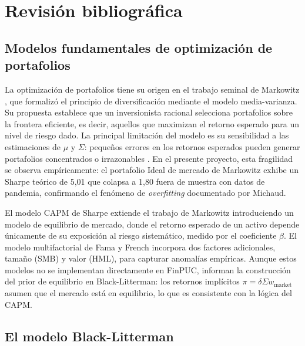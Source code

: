 \section{Revisi\'on bibliogr\'afica}

\subsection{Modelos fundamentales de optimizaci\'on de portafolios}

La optimizaci\'on de portafolios tiene su origen en el trabajo seminal de
Markowitz \cite{markowitz1952}, que formaliz\'o el principio de
diversificaci\'on mediante el modelo media-varianza. Su propuesta establece
que un inversionista racional selecciona portafolios sobre la frontera
eficiente, es decir, aquellos que maximizan el retorno esperado para un nivel
de riesgo dado. La principal limitaci\'on del modelo es su sensibilidad a las
estimaciones de $\mu$ y $\Sigma$: peque\~nos errores en los retornos
esperados pueden generar portafolios concentrados o irrazonables
\cite{michaud1989}. En el presente proyecto, esta fragilidad se observa
emp\'iricamente: el portafolio Ideal de mercado de Markowitz exhibe un Sharpe
te\'orico de 5,01 que colapsa a 1,80 fuera de muestra con datos de pandemia,
confirmando el fen\'omeno de \textit{overfitting} documentado por Michaud.

El modelo CAPM de Sharpe \cite{sharpe1964} extiende el trabajo de Markowitz
introduciendo un modelo de equilibrio de mercado, donde el retorno esperado
de un activo depende \'unicamente de su exposici\'on al riesgo sistem\'atico,
medido por el coeficiente $\beta$. El modelo multifactorial de Fama y French
\cite{famafrench1993} incorpora dos factores adicionales, tama\~no (SMB) y
valor (HML), para capturar anomal\'ias emp\'iricas. Aunque estos modelos no
se implementan directamente en FinPUC, informan la construcci\'on del prior
de equilibrio en Black-Litterman: los retornos impl\'icitos $\pi = \delta
\Sigma w_{\text{market}}$ asumen que el mercado est\'a en equilibrio, lo que
es consistente con la l\'ogica del CAPM.

\subsection{El modelo Black-Litterman}

